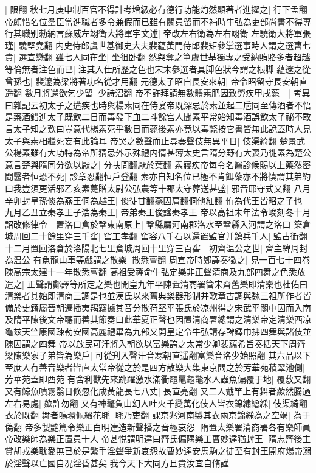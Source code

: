 |{
	限翻}
秋七月庚申制百官不得計考增級必有德行功能灼然顯著者進擢之|{
	行下孟翻}
帝頗惜名位羣臣當進職者多令兼假而已雖有闕員留而不補時牛弘為吏部尚書不得專行其職别勑納言蘇威左翊衛大將軍宇文述|{
	帝改左右衛為左右翊衛}
左驍衛大將軍張瑾|{
	驍堅堯翻}
内史侍郎虞世基御史大夫裴藴黃門侍郎裴矩參掌選事時人謂之選曹七貴|{
	選宣戀翻}
雖七人同在坐|{
	坐徂卧翻}
然與奪之筆虞世基獨專之受納賄賂多者超越等倫無者注色而已|{
	注其入仕所歷之色也宋末參選者具脚色狀今謂之根脚}
藴邃之從曾孫也|{
	裴邃為梁將著功名從才用翻}
元德太子昭自長安來朝|{
	帝令昭留守長安朝直遥翻}
數月將還欲乞少留|{
	少詩沼翻}
帝不許拜請無數體素肥因致勞疾甲戌薨　|{
	考異曰雜記云初太子之遘疾也時與楊素同在侍宴帝既深忌於素並起二巵同至傳酒者不悟是藥酒錯進太子既飲二日而毒發下血二斗餘宫人聞素平常始知毒酒誤飲太子祕不敢言太子知之歎曰豈意代楊素死乎數日而薨後素亦竟以毒斃按它書皆無此說蓋時人見太子與素相繼死妄有此論耳}
帝哭之數聲而止尋奏聲伎無異平日|{
	伎渠綺翻}
楚景武公楊素雖有大功特為帝所猜忌外示殊禮内情甚薄太史言隋分野有大喪乃徙素為楚公意言楚與隋同分欲以厭之|{
	分扶問翻厭於葉翻}
素寢疾帝每令名醫診候賜以上藥然密問醫者恒恐不死|{
	診章忍翻恒戶登翻}
素亦自知名位已極不肯餌藥亦不將慎謂其弟約曰我豈須更活邪乙亥素薨贈太尉公弘農等十郡太守葬送甚盛|{
	邪音耶守式又翻}
八月辛卯封皇孫倓為燕王侗為越王|{
	倓徒甘翻燕因肩翻侗他紅翻}
侑為代王皆昭之子也　九月乙丑立秦孝王子浩為秦王|{
	帝弟秦王俊諡秦孝王}
帝以高祖末年法令峻刻冬十月詔改修律令　置洛口倉於鞏東南原上|{
	鞏縣屬河南郡洛水至鞏縣入河謂之洛口}
築倉城周回二十餘里穿三千窖|{
	窖工孝翻}
窖容八千石以還置監官并鎮兵千人|{
	監古衘翻}
十二月置回洛倉於洛陽北七里倉城周回十里穿三百窖　初齊温公之世|{
	齊主緯周封為温公}
有魚龍山車等戲謂之散樂|{
	散悉亶翻}
周宣帝時鄭譯奏徵之|{
	見一百七十四卷陳高宗太建十一年散悉亶翻}
高祖受禪命牛弘定樂非正聲清商及九部四舞之色悉放遣之|{
	正聲謂鄭譯等所定之樂也開皇九年平陳置清商署管宋齊舊樂即清樂也杜佑曰清樂者其始即清商三調是也並漢氏以來舊典樂器形制并歌章古調與魏三祖所作者皆備於史籍屬晉朝遷播夷羯竊據其音分散苻堅平張氏於凉州得之宋武平關中因而入南及隋平陳後文帝聽而善其節奏曰此華夏正聲也因置清商署總謂之清樂帝定清樂西凉龜兹天竺康國疎勒安國高麗禮畢為九部又開皇定令牛弘請存鞞鐸巾拂四舞與諸伎並陳因謂之四舞}
帝以啟民可汗將入朝欲以富樂誇之太常少卿裴藴希旨奏括天下周齊梁陳樂家子弟皆為樂戶|{
	可從刋入聲汗音寒朝直遥翻富樂音洛少始照翻}
其六品以下至庶人有善音樂者皆直太常帝從之於是四方散樂大集東京閲之於芳華苑積翠池側|{
	芳華苑蓋即西苑}
有舍利獸先來跳躍激水滿衢黿鼉龜鼈水人蟲魚偏覆于地|{
	覆敷又翻}
又有鯨魚噴霧翳日倏忽化成黃龍長七八丈|{
	長直亮翻}
又二人戴竿上有舞者歘然騰過左右易處|{
	歘許勿翻}
又有神鼇負山幻人吐火千變萬化伎人皆衣錦繡繒綵|{
	伎渠綺翻衣於既翻}
舞者鳴環佩綴花毦|{
	毦乃吏翻}
課京兆河南製其衣兩京錦綵為之空竭|{
	為于偽翻}
帝多製艶篇令樂正白明達造新聲播之音極哀怨|{
	隋置太樂署清商署各有樂師員帝改樂師為樂正置員十人}
帝甚悦謂明達曰齊氏偏隅樂工曹妙達猶封王|{
	隋志齊後主賞胡戎樂耽愛無已於是繁手淫聲爭新哀怨故曹妙達安馬駒之徒至有封王開府煬帝溺於淫聲以亡國自况淫昏甚矣}
我今天下大同方且貴汝宜自脩謹

